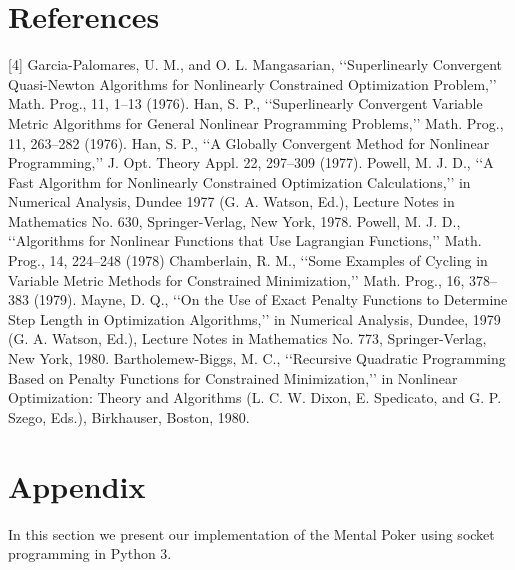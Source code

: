 \documentclass{article}
\begin{document}
\section{References}

[4] Garcia-Palomares, U. M., and O. L. Mangasarian, ‘‘Superlinearly Convergent
Quasi-Newton Algorithms for Nonlinearly Constrained Optimization Problem,’’
Math. Prog., 11, 1–13 (1976).
\newline\newline
[5] Han, S. P., ‘‘Superlinearly Convergent Variable Metric Algorithms for General Nonlinear Programming Problems,’’ Math. Prog., 11, 263–282 (1976).
\newline\newline
[6] Han, S. P., ‘‘A Globally Convergent Method for Nonlinear Programming,’’ J. Opt. Theory Appl. 22, 297–309 (1977).
\newline\newline
[7] Powell, M. J. D., ‘‘A Fast Algorithm for Nonlinearly Constrained Optimization Calculations,’’ in Numerical Analysis, Dundee 1977 (G. A. Watson, Ed.), Lecture Notes in Mathematics No. 630, Springer-Verlag, New York, 1978.
\newline\newline
[8] Powell, M. J. D., ‘‘Algorithms for Nonlinear Functions that Use Lagrangian Functions,’’ Math. Prog., 14, 224–248 (1978)
\newline\newline
[9] Chamberlain, R. M., ‘‘Some Examples of Cycling in Variable Metric Methods for Constrained Minimization,’’ Math. Prog., 16, 378–383 (1979).
\newline \newline
[10] Mayne, D. Q., ‘‘On the Use of Exact Penalty Functions to Determine Step Length in Optimization Algorithms,’’ in Numerical Analysis, Dundee, 1979 (G. A. Watson, Ed.), Lecture Notes in Mathematics No. 773, Springer-Verlag, New York, 1980.
\newline \newline
[11] Bartholemew-Biggs, M. C., ‘‘Recursive Quadratic Programming Based on Penalty Functions for Constrained Minimization,’’ in Nonlinear Optimization: Theory and Algorithms (L. C. W. Dixon, E. Spedicato, and G. P. Szego, Eds.), Birkhauser, Boston, 1980.

\section{Appendix}
In this section we present our implementation of the Mental Poker using socket programming in Python 3.
\end{document}

